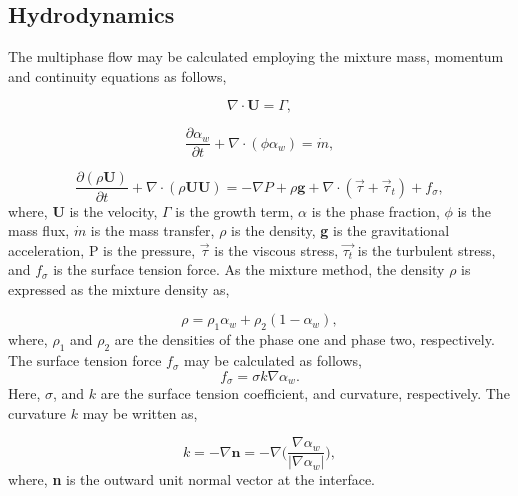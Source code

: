 \subsection{Hydrodynamics}
\label{Hydro}
The multiphase flow may be calculated employing the mixture mass, momentum and continuity equations as follows,

\begin{equation}
    \label{eq:continuity}
    \nabla \cdot \mathbf{U} = \Gamma,
\end{equation}

\begin{equation}
    \label{eq:mass}
    \frac{\partial \alpha_w}{\partial t} + \nabla\cdot (\phi \alpha_w) = \Dot{m},
\end{equation}

\begin{equation}
    \label{eq:momentum}
    \frac{\partial (\rho \mathbf{U})}{\partial t} + \nabla\cdot (\rho \mathbf{U U}) = -\nabla P + \rho \mathbf{g} +\nabla \cdot (\vec{\tau}+\vec{\tau}_t)+f_{\sigma},
\end{equation}
where, $\mathbf{U}$ is the velocity, $\Gamma$ is the growth term, $\alpha$ is the phase fraction, ${\phi}$ is the mass flux, ${\Dot{m}}$ is the mass transfer, ${\rho}$ is the density, \textbf{g} is the gravitational acceleration, P is the pressure, $\vec{\tau}$ is the viscous stress, $\vec{\tau_t}$ is the turbulent stress, and ${f_{\sigma}}$ is the surface tension force. As the mixture method, the density ${\rho}$ is expressed as the mixture density as,  

\begin{equation}
    \label{eq:mixtureDensity}
    \rho = \rho_1 \alpha_w + \rho_2 (1-\alpha_w),
\end{equation}
where, ${\rho_1}$ and ${\rho_2}$ are the densities of the phase one and phase two, respectively. The surface tension force ${f_{\sigma}}$ may be calculated as follows,
\begin{equation}
    \label{eq:surfaceTension}
    f_{\sigma} = \sigma k \nabla\alpha_w.
\end{equation}
Here, ${\sigma}$, and $k$ are the surface tension coefficient, and curvature, respectively. The curvature $k$ may be written as, 

\begin{equation}
    \label{eq:curvature}
    k = -\nabla \mathbf{n} = -\nabla \Bigg(\frac{\nabla \alpha_w}{\big| \nabla \alpha_w\big|} \Bigg),
\end{equation}
where, \textbf{n} is the outward unit normal vector at the interface.



